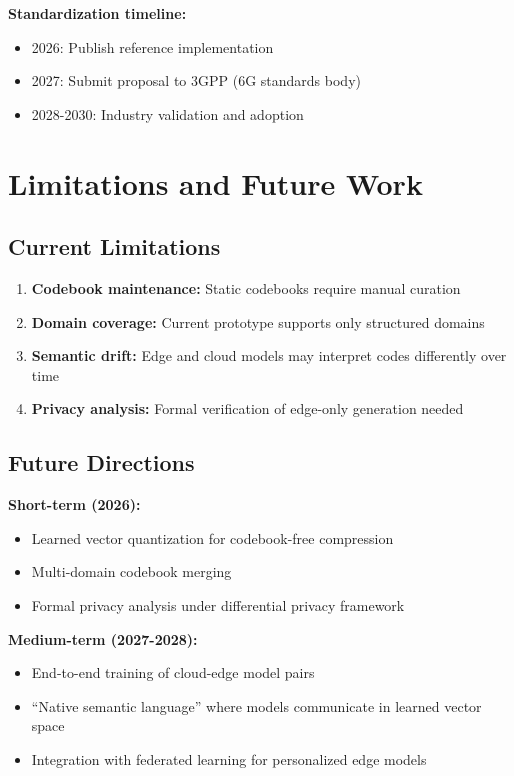 \documentclass{article}
\begin{document}
\textbf{Standardization timeline:}
\begin{itemize}
    \item 2026: Publish reference implementation
    \item 2027: Submit proposal to 3GPP (6G standards body)
    \item 2028-2030: Industry validation and adoption
\end{itemize}

\section{Limitations and Future Work}

\subsection{Current Limitations}

\begin{enumerate}
    \item \textbf{Codebook maintenance:} Static codebooks require manual curation
    \item \textbf{Domain coverage:} Current prototype supports only structured domains
    \item \textbf{Semantic drift:} Edge and cloud models may interpret codes differently over time
    \item \textbf{Privacy analysis:} Formal verification of edge-only generation needed
\end{enumerate}

\subsection{Future Directions}

\textbf{Short-term (2026):}
\begin{itemize}
    \item Learned vector quantization for codebook-free compression
    \item Multi-domain codebook merging
    \item Formal privacy analysis under differential privacy framework
\end{itemize}

\textbf{Medium-term (2027-2028):}
\begin{itemize}
    \item End-to-end training of cloud-edge model pairs
    \item ``Native semantic language'' where models communicate in learned vector space
    \item Integration with federated learning for personalized edge models
\end{itemize}
\end{document}
